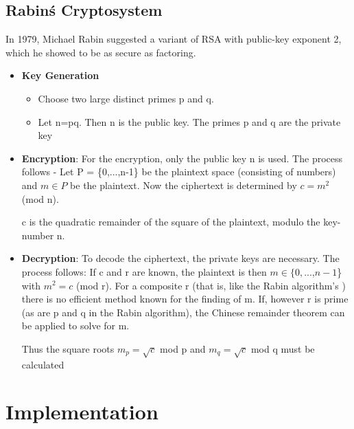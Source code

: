 \documentclass[12pt]{article} %
\begin{document}
\subsection{Rabin\'s Cryptosystem}
In 1979, Michael Rabin suggested a variant of RSA with public-key exponent 2, which he showed to be as secure as factoring.
\begin{itemize}
\item{\textbf{Key Generation}}
\begin{itemize}
\item{}Choose two large distinct primes p and q.
\item{}Let n=pq. Then n is the public key. The primes p and q are the private key
 \end{itemize}

\item{\textbf{Encryption}}:  For the encryption, only the public key n is used. The process follows -
Let  P = \{0,...,n-1\} be the plaintext space (consisting of numbers) and $m \in P$ be the plaintext. Now the ciphertext  is determined by $c = m^2 $(mod n).


c is the quadratic remainder of the square of the plaintext, modulo the key-number n.
\item{\textbf{Decryption}}:
To decode the ciphertext, the private keys are necessary. The process follows:
If c and r are known, the plaintext is then $m \in \{0,$...,$n-1$\} with $m^2=c$ (mod r). For a composite r (that is, like the Rabin algorithm's ) there is no efficient method known for the finding of m. If, however r is prime (as are p and q in the Rabin algorithm), the Chinese remainder theorem can be applied to solve for m.

Thus the square roots
$ m_p = \sqrt{c}$ mod p
and
$ m_q = \sqrt{c}$ mod q must be calculated
\end{itemize}


\section{Implementation}

%
%
\end{document}
